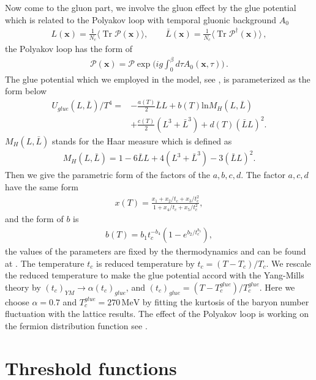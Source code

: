 \documentclass[%
reprint,
superscriptaddress,
showpacs,preprintnumbers,
 amsmath,amssymb,
 aps,
prd,
]{revtex4-1}
\newcommand{\Tr}{\ensuremath{\operatorname{Tr}}}
\begin{document}
Now come to the gluon part, we involve the gluon effect by the glue potential which is related to the Polyakov loop with temporal gluonic background $A_0$
\begin{align}
L(\bm x)=\frac{1}{N_c}\langle \Tr{\mathcal{P}(\bm x)} \rangle ,\qquad \bar{L} (\bm x)=\frac{1}{N_c}\langle \Tr{\mathcal{P}^{\dagger}(\bm x)} \rangle\,,\label{}
\end{align}
the Polyakov loop has the form of
\begin{align}
\mathcal{P}(\bm x)=\mathcal{P}\exp\bigg( ig\int_{0}^{\beta}d\tau A_0(\bm x,\tau) \bigg)\,.\label{}
\end{align}
The glue potential which we employed in the model, see \cite{Lo:2013hla}, is parameterized as the form below
\begin{align}
U_{glue}(L,\bar{L})/T^4=&-\frac{a(T)}{2}\bar{L}L+b(T)\mathrm{ln}M_H(L,\bar{L})\nonumber \\ 
&+\frac{c(T)}{2}(L^3+\bar{L}^3)+d(T)(\bar{L}L)^2.
\end{align}
$M_H(L,\bar{L})$ stands for the Haar measure which is defined as
\begin{align}
M_H(L,\bar{L})=1-6\bar{L}L+4(L^3+\bar{L}^3)-3(\bar{L}L)^2.
\end{align}
Then we give the parametric form of the factors of the $a,b,c,d$. The factor $a,c,d$ have the same form
\begin{align}
x(T)=\frac{x_1+x_2/t_c+x_3/t_c^2}{1+x_4/t_c+x_5/t_c^2},
\end{align}
and the form of $b$ is
\begin{align}
b(T)=b_1 t_c^{-b_4}(1-e^{b_2/t_c^{b_3}}),
\end{align}
the values of the parameters are fixed by the thermodynamics and can be found at \cite{Lo:2013hla}. The temperature $t_c$ is reduced temperature by $t_c=(T-T_c)/T_c$. We rescale the reduced temperature to make the glue potential accord with the Yang-Mills theory by $(t_c)_{YM}\rightarrow \alpha(t_c)_{glue}$, and $(t_c)_{glue}=(T-T^{glue}_c)/T^{glue}_c$. Here we choose $\alpha=0.7$ and $T^{glue}_c=270\,\mathrm{MeV}$ by fitting the kurtosis of the baryon number fluctuation with the lattice results. The effect of the Polyakov loop is working on the fermion distribution function see \cite{Fu:2015naa}. 







\section{Threshold functions}
\label{app:thresholdfun}
\end{document}

